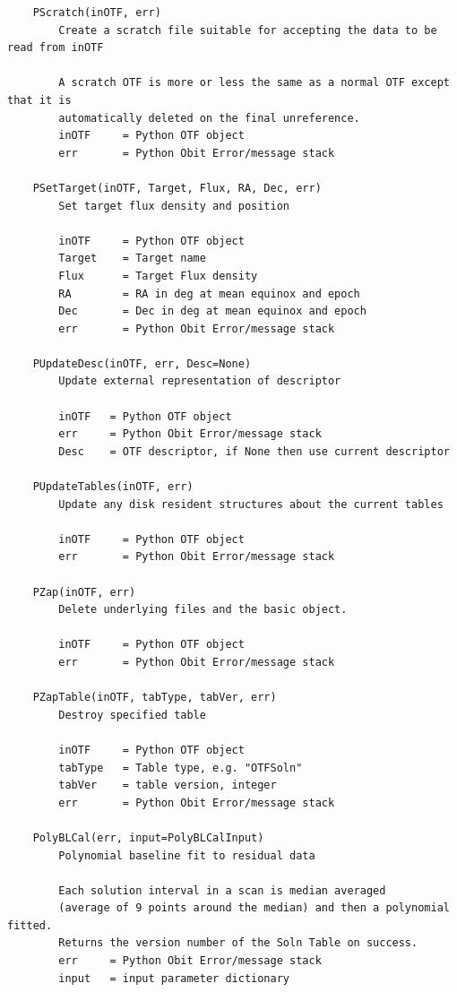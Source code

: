 \documentclass[11pt]{report}
\begin{document}
\begin{verbatim}
    PScratch(inOTF, err)
        Create a scratch file suitable for accepting the data to be read from inOTF
        
        A scratch OTF is more or less the same as a normal OTF except that it is
        automatically deleted on the final unreference.
        inOTF     = Python OTF object
        err       = Python Obit Error/message stack
    
    PSetTarget(inOTF, Target, Flux, RA, Dec, err)
        Set target flux density and position
        
        inOTF     = Python OTF object
        Target    = Target name
        Flux      = Target Flux density
        RA        = RA in deg at mean equinox and epoch
        Dec       = Dec in deg at mean equinox and epoch
        err       = Python Obit Error/message stack
    
    PUpdateDesc(inOTF, err, Desc=None)
        Update external representation of descriptor
        
        inOTF   = Python OTF object
        err     = Python Obit Error/message stack
        Desc    = OTF descriptor, if None then use current descriptor
    
    PUpdateTables(inOTF, err)
        Update any disk resident structures about the current tables
        
        inOTF     = Python OTF object
        err       = Python Obit Error/message stack
    
    PZap(inOTF, err)
        Delete underlying files and the basic object.
        
        inOTF     = Python OTF object
        err       = Python Obit Error/message stack
    
    PZapTable(inOTF, tabType, tabVer, err)
        Destroy specified table
        
        inOTF     = Python OTF object
        tabType   = Table type, e.g. "OTFSoln"
        tabVer    = table version, integer
        err       = Python Obit Error/message stack
    
    PolyBLCal(err, input=PolyBLCalInput)
        Polynomial baseline fit to residual data
        
        Each solution interval in a scan is median averaged
        (average of 9 points around the median) and then a polynomial fitted.
        Returns the version number of the Soln Table on success.
        err     = Python Obit Error/message stack
        input   = input parameter dictionary
        

\end{verbatim}
\end{document}
